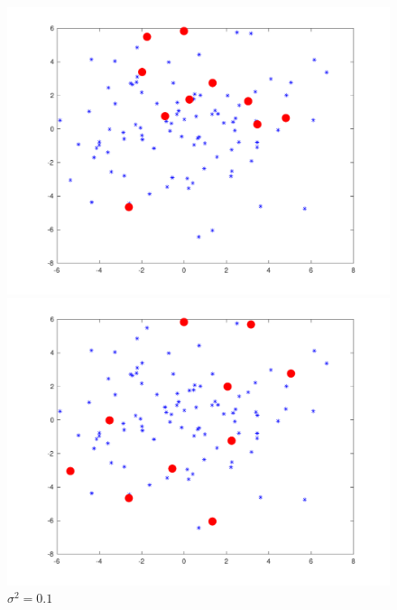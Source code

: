 \clearpage
\begingroup
\setlength{\columnsep}{0.8cm}
\setlength{\intextsep}{0.5cm}
\begin{figure}
\vspace{-1.0cm}
\begin{minipage}{\linewidth}
    \centering\captionsetup[subfigure]{justification=centering}
    \includegraphics[width=\linewidth]{../src/figures/fixedsize/fixedsize_1}
    \caption*{$\sigma^2=0.01$}
\includegraphics[width=\linewidth]{../src/figures/fixedsize/fixedsize_10}
    \caption*{$\sigma^2=0.1$}

\end{minipage}
\end{figure}
